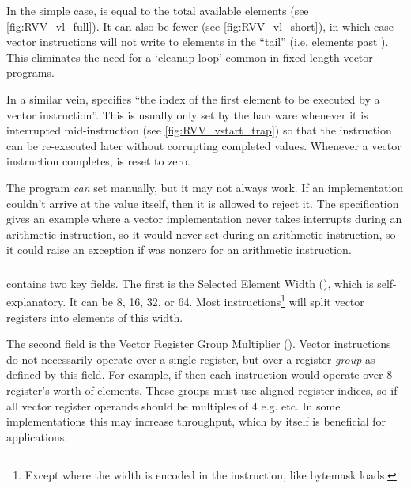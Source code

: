 In the simple case,  is equal to the total available elements (see \cref{fig:RVV_vl_full}).
It can also be fewer (see \cref{fig:RVV_vl_short}), in which case vector instructions will not write to elements in the \enquote{tail} (i.e. elements past ).
This eliminates the need for a `cleanup loop' common in fixed-length vector programs.


In a similar vein,  specifies \enquote{the index of the first element to be executed by a vector instruction}.
This is usually only set by the hardware whenever it is interrupted mid-instruction (see \cref{fig:RVV_vstart_trap}) so that the instruction can be re-executed later without corrupting completed values.
Whenever a vector instruction completes,  is reset to zero.

The program \emph{can} set  manually, but it may not always work.
If an implementation couldn't arrive at the value itself, then it is allowed to reject it.
The specification gives an example where a vector implementation never takes interrupts during an arithmetic instruction, so it would never set  during an arithmetic instruction, so it could raise an exception if  was nonzero for an arithmetic instruction.


\subsubsection{}
 contains two key fields.
The first is the Selected Element Width (), which is self-explanatory.
It can be 8, 16, 32, or 64.
Most instructions\footnote{Except where the width is encoded in the instruction, like bytemask loads.} will split vector registers into elements of this width.

The second field is the Vector Register Group Multiplier ().
Vector instructions do not necessarily operate over a single register, but over a register \emph{group} as defined by this field.
For example, if  then each instruction would operate over 8 register's worth of elements.
These groups must use aligned register indices, so if  all vector register operands should be multiples of 4 e.g.  etc.
In some implementations this may increase throughput, which by itself is beneficial for applications.

